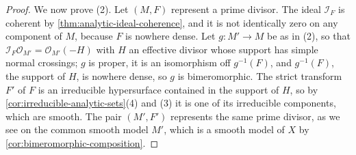 \begin{proof}
We now prove (2). Let $(M,F)$ represent a prime divisor. The ideal $\mathcal I_F$ is coherent by \cref{thm:analytic-ideal-coherence}, and it is not identically zero on any component of $M$, because $F$ is nowhere dense. Let $g\colon M'\to M$ be as in (2), so that $\mathcal I_F\mathcal O_{M'}=\mathcal O_{M'}(-H)$ with $H$ an effective divisor whose support has simple normal crossings; $g$ is proper, it is an isomorphism off $g^{-1}(F)$, and $g^{-1}(F)$, the support of $H$, is nowhere dense, so $g$ is bimeromorphic. The strict transform $F'$ of $F$ is an irreducible hypersurface contained in the support of $H$, so by \cref{cor:irreducible-analytic-sets}(4) and (3) it is one of its irreducible components, which are smooth. The pair $(M',F')$ represents the same prime divisor, as we see on the common smooth model $M'$, which is a smooth model of $X$ by \cref{cor:bimeromorphic-composition}.
\end{proof}

